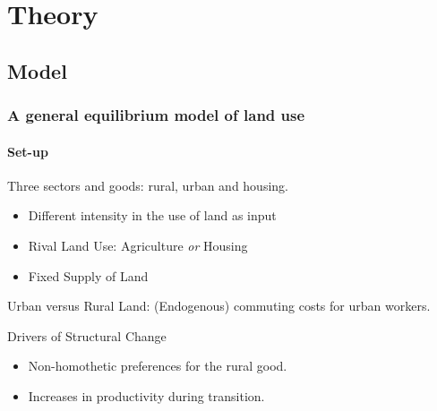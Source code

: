 \documentclass[aspectratio=169]{beamer}
\begin{document}

\section{Theory}
\subsection{Model}
\begin{frame}
\frametitle{A general equilibrium model of land use}
\framesubtitle{Set-up}

\begin{midi}
\item Three sectors and goods: rural, urban and housing.
\begin{itemize}
	\item Different intensity in the use of land as input
	\item Rival Land Use: Agriculture \emph{or} Housing
	\item Fixed Supply of Land
\end{itemize}

\item Urban versus Rural Land: (Endogenous) commuting costs for urban workers.

\item Drivers of Structural Change
\begin{itemize}
	\item Non-homothetic preferences for the rural good.
	\item Increases in productivity during transition.
\end{itemize}
\end{midi}
\end{frame}

\end{document}
